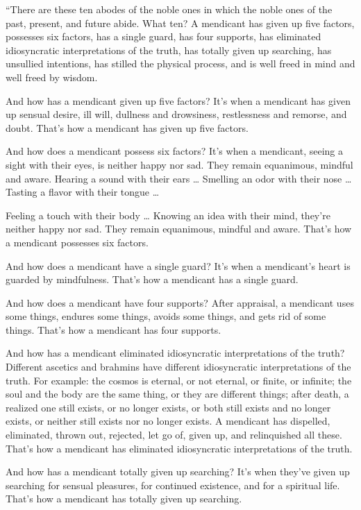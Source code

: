 \documentclass[12pt,openany]{book}%
\begin{document}
“There are these ten abodes of the noble ones in which the noble ones of the past, present, and future abide. What ten? A mendicant has given up five factors, possesses six factors, has a single guard, has four supports, has eliminated idiosyncratic interpretations of the truth, has totally given up searching, has unsullied intentions, has stilled the physical process, and is well freed in mind and well freed by wisdom. 

And how has a mendicant given up five factors? It’s when a mendicant has given up sensual desire, ill will, dullness and drowsiness, restlessness and remorse, and doubt. That’s how a mendicant has given up five factors. 

And how does a mendicant possess six factors? It’s when a mendicant, seeing a sight with their eyes, is neither happy nor sad. They remain equanimous, mindful and aware. Hearing a sound with their ears … Smelling an odor with their nose … Tasting a flavor with their tongue … 

Feeling a touch with their body … Knowing an idea with their mind, they’re neither happy nor sad. They remain equanimous, mindful and aware. That’s how a mendicant possesses six factors. 

And how does a mendicant have a single guard? It’s when a mendicant’s heart is guarded by mindfulness. That’s how a mendicant has a single guard. 

And how does a mendicant have four supports? After appraisal, a mendicant uses some things, endures some things, avoids some things, and gets rid of some things. That’s how a mendicant has four supports. 

And how has a mendicant eliminated idiosyncratic interpretations of the truth? Different ascetics and brahmins have different idiosyncratic interpretations of the truth. For example: the cosmos is eternal, or not eternal, or finite, or infinite; the soul and the body are the same thing, or they are different things; after death, a realized one still exists, or no longer exists, or both still exists and no longer exists, or neither still exists nor no longer exists. A mendicant has dispelled, eliminated, thrown out, rejected, let go of, given up, and relinquished all these. That’s how a mendicant has eliminated idiosyncratic interpretations of the truth. 

And how has a mendicant totally given up searching? It’s when they’ve given up searching for sensual pleasures, for continued existence, and for a spiritual life. That’s how a mendicant has totally given up searching. 
\end{document}
